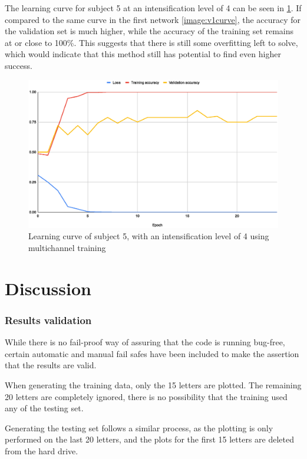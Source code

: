 \documentclass[conference]{IEEEtran}
\begin{document}
The learning curve for subject 5 at an intensification level of 4 can be seen in \ref{image:v3curve}. If compared to the same curve in the first network \ref{image:v1curve}, the accuracy for the validation set is much higher, while the accuracy of the training set remains at or close to 100\%. This suggests that there is still some overfitting left to solve, which would indicate that this method still has potential to find even higher success.


\begin{figure}[h]
  \centering
  \includegraphics[width=\linewidth]{images/v3curve.eps}
  \caption[MSV16 Learning curve]{Learning curve of subject 5, with an intensification level of 4 using multichannel training}
  \label{image:v3curve}
\end{figure}




\section{Discussion}


\subsubsection{Results validation}
While there is no fail-proof way of assuring that the code is running bug-free, certain automatic and manual fail safes have been included to make the assertion that the results are valid.

When generating the training data, only the 15 letters are plotted. The remaining 20 letters are completely ignored, there is no possibility that the training used any of the testing set. 

Generating the testing set follows a similar process, as the plotting is only performed on the last 20 letters, and the plots for the first 15 letters are deleted from the hard drive.
\end{document}
